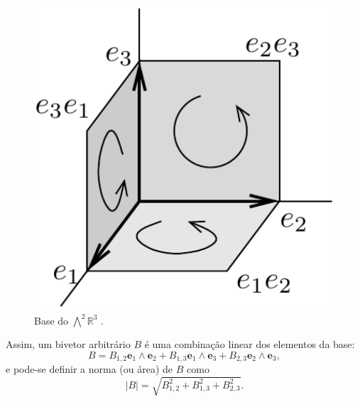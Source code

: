 \documentclass[a4paper,12pt]{report}
\theoremstyle{plain}
\theoremstyle{definition}
\newcommand{\norm}[1]{\left| #1 \right|}
\begin{document}
\begin{minipage}{0.35\linewidth}
	\begin{figure}[H]
		\begin{center}
			\includegraphics[width=0.7\linewidth]{figures/bivectorsBase.pdf}
		\end{center}
		\caption{Base do $\bigwedge^2\mathbb{R}^3$ \cite{lounestoClifford}.}
		\label{fig:bivectorsBase}
	\end{figure}
\end{minipage}
\begin{minipage}{0.6\linewidth}
	\setlength\parindent{24pt} Assim, um bivetor arbitrário $B$ é uma combinação linear dos elementos da base: $$B = B_{1,2}\mathbf e_1\wedge \mathbf e_2 + B_{1,3}\mathbf e_1\wedge \mathbf e_3 + B_{2,3}\mathbf e_2\wedge \mathbf e_3,$$ e pode-se definir a norma (ou área) de $B$ como $$\norm{B} = \sqrt{B_{1,2}^2 + B_{1,3}^2 + B_{2,3}^2}.$$
\end{minipage}
\end{document}
